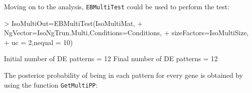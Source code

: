\documentclass{article}
\begin{document}

\noindent
Moving on to the analysis, \verb+EBMultiTest+ could be used to perform the test:
\begin{Schunk}
\begin{Sinput}
> IsoMultiOut=EBMultiTest(IsoMultiMat,
+ NgVector=IsoNgTrun.Multi,Conditions=Conditions,
+ sizeFactors=IsoMultiSize, 
+ uc = 2,nequal = 10)
\end{Sinput}
\begin{Soutput}
Initial number of DE patterns = 12
Final number of DE patterns = 12
\end{Soutput}
\end{Schunk}
\noindent The posterior probability of being in each pattern for every gene is obtained by using the 
function \verb+GetMultiPP+:
\end{document}
